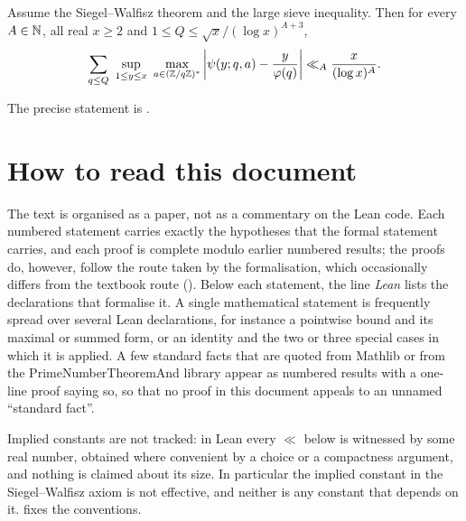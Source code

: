 \begin{theorem*}
Assume the Siegel--Walfisz theorem and the large sieve inequality. Then for every $A \in \mathbb{N}$, all real
$x \ge 2$ and $1 \le Q \le \sqrt x/(\log x)^{A+3}$,
$$\sum_{q \le Q}\ \sup_{1 \le y \le x}\ \max_{a \in (\Z/q\Z)^*} \left| \psi(y; q, a) - \frac{y}{\varphi(q)} \right| \ll_A \frac{x}{(\log x)^A} .$$
\end{theorem*}
The precise statement is .

\section*{How to read this document}

The text is organised as a paper, not as a commentary on the Lean code. Each numbered statement
carries exactly the hypotheses that the formal statement carries, and each proof is complete
modulo earlier numbered results; the proofs do, however, follow the route taken by the
formalisation, which occasionally differs from the textbook route (). Below each
statement, the line \emph{Lean} lists the declarations that formalise it. A single mathematical
statement is frequently spread over several Lean declarations, for instance a pointwise bound and its
maximal or summed form, or an identity and the two or three special cases in which it is applied. A
few standard facts that are quoted from Mathlib or from the PrimeNumberTheoremAnd library appear as
numbered results with a one-line proof saying so, so that no proof in this document appeals to an
unnamed ``standard fact''.

Implied constants are not tracked: in Lean every $\ll$ below is witnessed by some real number,
obtained where convenient by a choice or a compactness argument, and nothing is claimed about its
size. In particular the implied constant in the Siegel--Walfisz axiom is not effective, and neither is
any constant that depends on it.  fixes the conventions.

